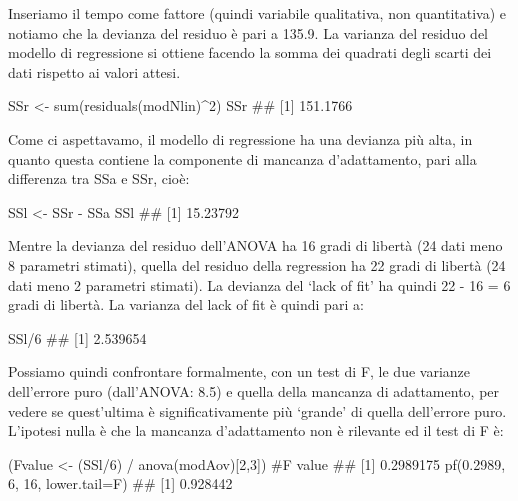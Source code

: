 \documentclass[a4paper,12pt,oneside]{book}
\newenvironment{Shaded}{\begin{snugshade}}{\end{snugshade}}
\newcommand{\DecValTok}[1]{#1}
\newcommand{\FloatTok}[1]{#1}
\newcommand{\SpecialCharTok}[1]{#1}
\newcommand{\CommentTok}[1]{#1}
\newcommand{\DocumentationTok}[1]{#1}
\newcommand{\OtherTok}[1]{#1}
\newcommand{\FunctionTok}[1]{#1}
\newcommand{\AttributeTok}[1]{#1}
\newcommand{\NormalTok}[1]{#1}
\begin{document}
Inseriamo il tempo come fattore (quindi variabile qualitativa, non quantitativa) e notiamo che la devianza del residuo è pari a 135.9. La varianza del residuo del modello di regressione si ottiene facendo la somma dei quadrati degli scarti dei dati rispetto ai valori attesi.

\begin{Shaded}
\begin{Highlighting}[]
\NormalTok{SSr }\OtherTok{\textless{}{-}} \FunctionTok{sum}\NormalTok{(}\FunctionTok{residuals}\NormalTok{(modNlin)}\SpecialCharTok{\^{}}\DecValTok{2}\NormalTok{)}
\NormalTok{SSr}
\DocumentationTok{\#\# [1] 151.1766}
\end{Highlighting}
\end{Shaded}

Come ci aspettavamo, il modello di regressione ha una devianza più alta, in quanto questa contiene la componente di mancanza d'adattamento, pari alla differenza tra SSa e SSr, cioè:

\begin{Shaded}
\begin{Highlighting}[]
\NormalTok{SSl }\OtherTok{\textless{}{-}}\NormalTok{ SSr }\SpecialCharTok{{-}}\NormalTok{ SSa}
\NormalTok{SSl}
\DocumentationTok{\#\# [1] 15.23792}
\end{Highlighting}
\end{Shaded}

Mentre la devianza del residuo dell'ANOVA ha 16 gradi di libertà (24 dati meno 8 parametri stimati), quella del residuo della regression ha 22 gradi di libertà (24 dati meno 2 parametri stimati). La devianza del `lack of fit' ha quindi 22 - 16 = 6 gradi di libertà. La varianza del lack of fit è quindi pari a:

\begin{Shaded}
\begin{Highlighting}[]
\NormalTok{SSl}\SpecialCharTok{/}\DecValTok{6}
\DocumentationTok{\#\# [1] 2.539654}
\end{Highlighting}
\end{Shaded}

Possiamo quindi confrontare formalmente, con un test di F, le due varianze dell'errore puro (dall'ANOVA: 8.5) e quella della mancanza di adattamento, per vedere se quest'ultima è significativamente più `grande' di quella dell'errore puro. L'ipotesi nulla è che la mancanza d'adattamento non è rilevante ed il test di F è:

\begin{Shaded}
\begin{Highlighting}[]
\NormalTok{(Fvalue }\OtherTok{\textless{}{-}}\NormalTok{ (SSl}\SpecialCharTok{/}\DecValTok{6}\NormalTok{) }\SpecialCharTok{/} \FunctionTok{anova}\NormalTok{(modAov)[}\DecValTok{2}\NormalTok{,}\DecValTok{3}\NormalTok{]) }\CommentTok{\#F value}
\DocumentationTok{\#\# [1] 0.2989175}
\FunctionTok{pf}\NormalTok{(}\FloatTok{0.2989}\NormalTok{, }\DecValTok{6}\NormalTok{, }\DecValTok{16}\NormalTok{, }\AttributeTok{lower.tail=}\NormalTok{F)}
\DocumentationTok{\#\# [1] 0.928442}
\end{Highlighting}
\end{Shaded}
\end{document}
